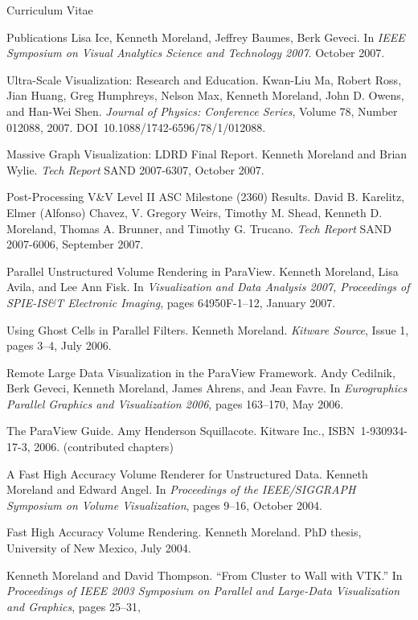 \documentclass{article}
\begin{document}
\begin{cv}{Curriculum Vitae}
\begin{cvlist}{Publications}
      Lisa Ice, Kenneth Moreland, Jeffrey Baumes, Berk Geveci. In
      \emph{IEEE Symposium on Visual Analytics Science and Technology
        2007}. October 2007.
    \item[Ultra-Scale Visualization: Research and Education.] Kwan-Liu Ma,
      Robert Ross, Jian Huang, Greg Humphreys, Nelson Max, Kenneth
      Moreland, John D. Owens, and Han-Wei Shen. \emph{Journal of Physics:
        Conference Series}, Volume 78, Number 012088,
      2007. DOI~10.1088/1742-6596/78/1/012088.
    \item[Massive Graph Visualization: LDRD Final Report.] Kenneth Moreland
      and Brian Wylie.  \emph{Tech Report} SAND 2007-6307, October 2007.
    \item[Post-Processing V\&V Level II ASC Milestone (2360) Results.]
      David B. Karelitz, Elmer (Alfonso) Chavez, V. Gregory Weirs, Timothy
      M. Shead, Kenneth D. Moreland, Thomas A. Brunner, and Timothy
      G. Trucano.  \emph{Tech Report} SAND 2007-6006, September 2007.
    \item[Parallel Unstructured Volume Rendering in ParaView.] Kenneth
      Moreland, Lisa Avila, and Lee Ann Fisk.  In \emph{Visualization and
        Data Analysis 2007, Proceedings of SPIE-IS\&T Electronic Imaging},
      pages 64950F-1--12, January 2007.
    \item[Using Ghost Cells in Parallel Filters.] Kenneth Moreland.
      \emph{Kitware Source}, Issue 1, pages 3--4, July 2006.
    \item[Remote Large Data Visualization in the ParaView Framework.] Andy
      Cedilnik, Berk Geveci, Kenneth Moreland, James Ahrens, and Jean
      Favre.  In \emph{Eurographics Parallel Graphics and Visualization
        2006}, pages 163--170, May 2006.
    \item[The ParaView Guide.] Amy Henderson Squillacote.  Kitware
      Inc., ISBN~1-930934-17-3, 2006. (contributed chapters)
    \item[A Fast High Accuracy Volume Renderer for Unstructured Data.]
      Kenneth Moreland and Edward Angel.  In \emph{Proceedings of the
        IEEE/SIGGRAPH Symposium on Volume Visualization}, pages 9--16,
      October 2004.
    \item[Fast High Accuracy Volume Rendering.] Kenneth Moreland.  PhD
      thesis, University of New Mexico, July 2004.
    \item Kenneth Moreland and David Thompson.  ``From Cluster to Wall
      with VTK.''  In \emph{Proceedings of IEEE 2003 Symposium on
      Parallel and Large-Data Visualization and Graphics}, pages 25--31,

\end{cvlist}
\end{cv}
\end{document}
